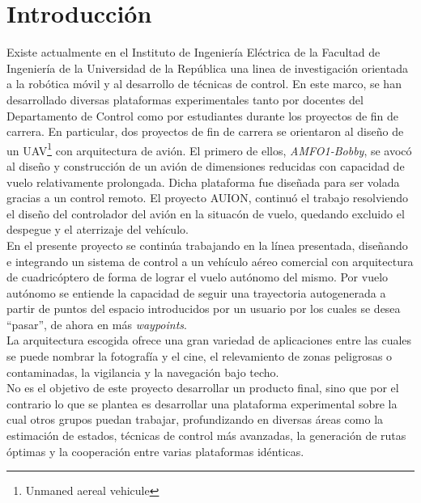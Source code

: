 \documentclass[main]{subfiles}
\begin{document}
\chapter*{Introducci\'on}

Existe actualmente en el Instituto de Ingenier\'ia El\'ectrica de la Facultad de Ingenier\'ia de la Universidad de la Rep\'ublica una linea de investigaci\'on orientada a la rob\'otica m\'ovil y al desarrollo de t\'ecnicas de control. En este marco, se han desarrollado diversas plataformas experimentales tanto por docentes del Departamento de Control como por estudiantes durante los proyectos de fin de carrera. En particular, dos proyectos de fin de carrera se orientaron al diseño de un UAV\footnote{Unmaned aereal vehicule} con arquitectura de avi\'on. El primero de ellos, \emph{AMFO1-Bobby}, se avoc\'o al diseño y construcci\'on de un avi\'on de dimensiones reducidas con capacidad de vuelo relativamente prolongada. Dicha plataforma fue dise\~nada para ser volada gracias a un control remoto. El proyecto AUION, continu\'o el trabajo resolviendo el diseño del controlador del avi\'on en la situac\'on de vuelo, quedando excluido el despegue y el aterrizaje del veh\'iculo.\\

En el presente proyecto se contin\'ua trabajando en la línea presentada, dise\~nando e integrando un sistema de control a un veh\'iculo a\'ereo comercial con arquitectura de cuadric\'optero de forma de lograr el vuelo aut\'onomo del mismo. Por vuelo aut\'onomo se entiende la capacidad de seguir una trayectoria autogenerada a partir de puntos del espacio introducidos por un usuario por los cuales se desea ``pasar'', de ahora en m\'as \emph{waypoints}. \\

La arquitectura escogida ofrece una gran variedad de aplicaciones entre las cuales se puede nombrar la fotograf\'ia y el cine, el relevamiento de zonas peligrosas o contaminadas, la  vigilancia y la navegaci\'on bajo techo. \\

No es el objetivo de este proyecto desarrollar un producto final, sino que por el contrario lo que se plantea es desarrollar una plataforma experimental sobre la cual otros grupos puedan trabajar, profundizando en diversas \'areas como la estimaci\'on de estados, t\'ecnicas de control m\'as avanzadas, la generaci\'on de rutas \'optimas y la cooperaci\'on entre varias plataformas id\'enticas.\\
\end{document}
